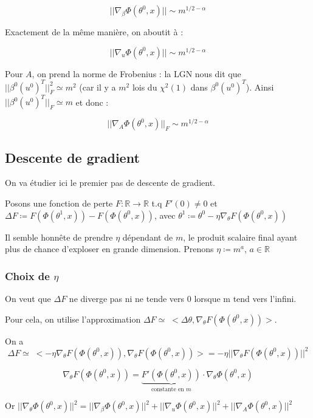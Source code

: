 \documentclass[a4paper, 11pt, french]{article}
\theoremstyle{definition}
\begin{document}
	 \[||\nabla_{\beta} \Phi (\theta^0, x)|| \sim m^{1/2 - \alpha}\]
	 
	 Exactement de la même manière, on aboutit à :
	 
	 \[||\nabla_u \Phi (\theta^0, x)|| \sim m^{1/2 - \alpha}\]
	 
	 Pour $A$, on prend la norme de Frobenius : la LGN nous dit que $||\beta^0 (u^0)^T||_F^2 \simeq m^2 $ (car il y a $m^2$ lois du $\chi^2(1)$ dans $\beta^0 (u^0)^T$). Ainsi $||\beta^0 (u^0)^T||_F \simeq m$ et donc :
	 
	 \[||\nabla_A \Phi (\theta^0, x)||_F \sim m^{1/2 - \alpha}\]
	 
	 \subsection{Descente de gradient}
	 
	 On va étudier ici le premier pas de descente de gradient.
	 
	 Posons une fonction de perte $F : \mathbb{R} \rightarrow \mathbb{R}$ t.q $F'(0) \neq 0$ et 
	 $\Delta F \coloneqq F(\Phi(\theta^1, x)) - F(\Phi(\theta^0, x))$, avec 
	 $\theta^1 \coloneqq \theta^0 - \eta \nabla_{\theta} F(\Phi(\theta^0, x))$
	 
	 Il semble honnête de prendre $\eta$ dépendant de $m$, le produit scalaire final ayant plus de chance d'exploser en grande dimension. Prenons $\eta \coloneqq m^a$, $a \in \mathbb{R}$ \\
	 
	 \subsubsection{Choix de $\eta$}
	 
	 On veut que $\Delta F$ ne diverge pas ni ne tende vers 0 lorsque m tend vers l'infini.
	 
	 Pour cela, on utilise l'approximation 
	 $\Delta F \simeq \; < \Delta \theta, \nabla_{\theta} F(\Phi(\theta^0, x)) >$.
	 
	 On a 
	 \[
	 \Delta F \simeq \; < -\eta \nabla_{\theta} F(\Phi(\theta^0, x)) , \nabla_{\theta} F(\Phi(\theta^0, x)) > = -\eta || \nabla_{\theta} F(\Phi(\theta^0, x)) ||^2
	 \]
	 
	 \[
	 \nabla_{\theta} F(\Phi(\theta^0, x)) = 
	 \underbrace{F'(\Phi(\theta^0, x))}_\text{constante en $m$} 
	 \cdot \nabla_{\theta} \Phi(\theta^0, x)
	 \]
	 
	 Or $ || \nabla_{\theta} \Phi(\theta^0, x) ||^2 = || \nabla_{\beta} \Phi(\theta^0, x) ||^2 + || \nabla_{u} \Phi(\theta^0, x) ||^2 + || \nabla_{A} \Phi(\theta^0, x) ||^2$ \\
	 
\end{document}
